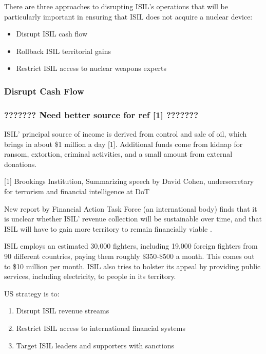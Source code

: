 \documentclass{report}
\begin{document}
There are three approaches to disrupting ISIL’s operations that will be particularly important in ensuring that ISIL does not acquire a nuclear device:

\begin{itemize}
  \item Disrupt ISIL cash flow
  \item Rollback ISIL territorial gains
  \item Restrict ISIL access to nuclear weapons experts
\end{itemize}

\subsubsection{Disrupt Cash Flow}

\subsubsection{???????  Need better source for ref [1]    ???????}

ISIL’ principal source of income is derived from control and sale of oil, which brings in about \$1 million a day [1]. Additional funds come from kidnap for ransom, extortion, criminal activities, and a small amount from external donations. 

[1]  Brookings Institution, Summarizing speech by David Cohen, undersecretary for terrorism and financial intelligence at DoT

New report by Financial Action Task Force (an international body) finds that it is unclear whether ISIL’ revenue collection will be sustainable over time, and that ISIL will have to gain more territory to remain financially viable \cite{TheEditorialBoard2015,Report2015}.

ISIL employs an estimated 30,000 fighters, including 19,000 foreign fighters from 90 different countries, paying them roughly \$350-\$500 a month. This comes out to \$10 million per month. ISIL also tries to bolster its appeal by providing public services, including electricity, to people in its territory. 

US strategy is to:

\begin{enumerate}
  \item Disrupt ISIL revenue streams
  \item Restrict ISIL access to international financial systems
  \item Target ISIL leaders and supporters with sanctions
\end{enumerate}
\end{document}

